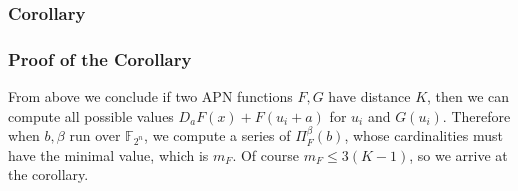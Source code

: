 \documentclass[
    aspectratio=169,                   %
]{beamer}
\newcommand{\F}{\mathbb{F}}
\begin{document}
    \begin{frame}
        \frametitle{Corollary}
    
    \end{frame}

    \begin{frame}
        \frametitle{Proof of the Corollary}
    
        From above we conclude if two APN functions $ F,G $ have distance $ K $, then we can compute all possible values $ D_aF(x)+F(u_i+a) $
        for $ u_i $ and $ G(u_i) $.  
        Therefore when $ b,\beta $ run over $ \F_{2^n} $, we compute a series of $ \Pi_F^{\beta}(b) $,
        whose cardinalities must have the minimal value, which is $ m_F $.
        Of course $ m_F\leq 3(K-1) $, so we arrive at the corollary.

    \end{frame}
\end{document}

